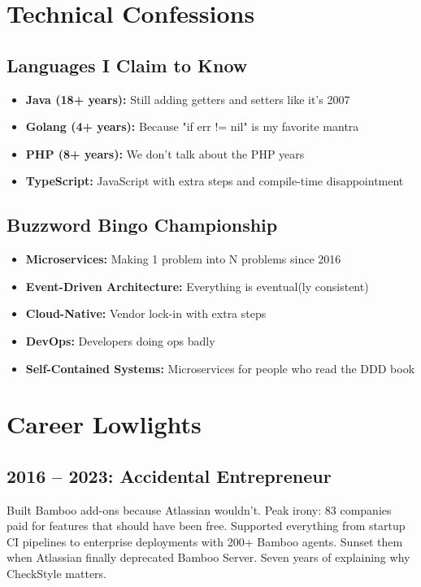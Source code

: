 \documentclass[11pt,a4paper]{article}
\begin{document}
\section*{Technical Confessions}

\subsection*{Languages I Claim to Know}
\begin{itemize}
\item \textbf{Java (18+ years):} Still adding getters and setters like it's 2007
\item \textbf{Golang (4+ years):} Because "if err != nil" is my favorite mantra
\item \textbf{PHP (8+ years):} We don't talk about the PHP years
\item \textbf{TypeScript:} JavaScript with extra steps and compile-time disappointment
\end{itemize}

\subsection*{Buzzword Bingo Championship}
\begin{itemize}
\item \textbf{Microservices:} Making 1 problem into N problems since 2016
\item \textbf{Event-Driven Architecture:} Everything is eventual(ly consistent)
\item \textbf{Cloud-Native:} Vendor lock-in with extra steps
\item \textbf{DevOps:} Developers doing ops badly
\item \textbf{Self-Contained Systems:} Microservices for people who read the DDD book
\end{itemize}

\section*{Career Lowlights}

\subsection*{2016 -- 2023: Accidental Entrepreneur}
Built Bamboo add-ons because Atlassian wouldn't. Peak irony: 83 companies paid for features that should have been free. Supported everything from startup CI pipelines to enterprise deployments with 200+ Bamboo agents. Sunset them when Atlassian finally deprecated Bamboo Server. Seven years of explaining why CheckStyle matters.
\end{document}
